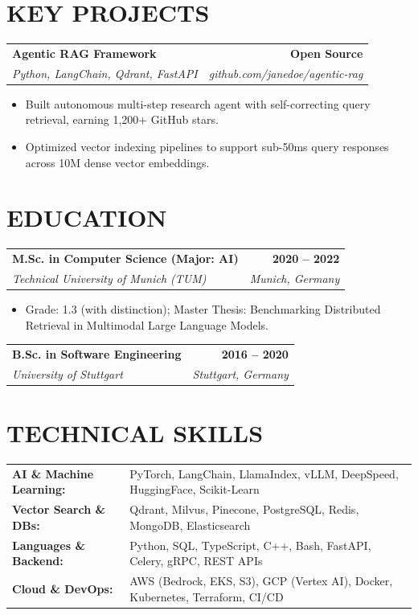 \documentclass[a4paper,11pt]{article}
\makeatletter
\newcommand{\entryheader}[4]{%
  \begin{tabularx}{\textwidth}{@{}>{\RaggedRight\arraybackslash}X r@{}}
    \textbf{#1} & \textbf{#2} \\
    \textit{#3} & \textit{#4} \\
  \end{tabularx}%
}
\newenvironment{entrybullets}{%
  \begin{minipage}[t]{0.98\textwidth}
    \begin{itemize}[leftmargin=*,label=\textbullet,align=left]
}{%
    \end{itemize}
  \end{minipage}
}
\makeatother
\begin{document}
\section*{KEY PROJECTS}
\entryheader{Agentic RAG Framework}{Open Source}{Python, LangChain, Qdrant, FastAPI}{github.com/janedoe/agentic-rag}
\begin{entrybullets}
  \item Built autonomous multi-step research agent with self-correcting query retrieval, earning 1,200+ GitHub stars.
  \item Optimized vector indexing pipelines to support sub-50ms query responses across 10M dense vector embeddings.
\end{entrybullets}

\section*{EDUCATION}
\entryheader{M.Sc. in Computer Science (Major: AI)}{2020 -- 2022}{Technical University of Munich (TUM)}{Munich, Germany}
\begin{entrybullets}
  \item Grade: 1.3 (with distinction); Master Thesis: Benchmarking Distributed Retrieval in Multimodal Large Language Models.
\end{entrybullets}

\vspace{0.15cm}
\entryheader{B.Sc. in Software Engineering}{2016 -- 2020}{University of Stuttgart}{Stuttgart, Germany}

\section*{TECHNICAL SKILLS}
\begin{tabularx}{\textwidth}{@{}l X@{}}
  \textbf{AI \& Machine Learning:} & PyTorch, LangChain, LlamaIndex, vLLM, DeepSpeed, HuggingFace, Scikit-Learn \\
  \textbf{Vector Search \& DBs:} & Qdrant, Milvus, Pinecone, PostgreSQL, Redis, MongoDB, Elasticsearch \\
  \textbf{Languages \& Backend:} & Python, SQL, TypeScript, C++, Bash, FastAPI, Celery, gRPC, REST APIs \\
  \textbf{Cloud \& DevOps:} & AWS (Bedrock, EKS, S3), GCP (Vertex AI), Docker, Kubernetes, Terraform, CI/CD \\
\end{tabularx}
\end{document}
